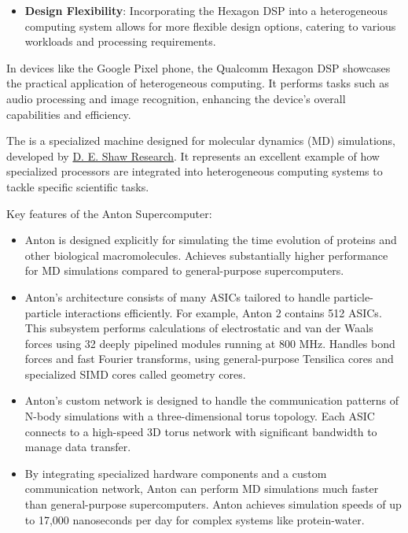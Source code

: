\begin{examplebox}
\begin{itemize}[label=\textcolor{Green3}{}]
        \item \textcolor{Green3}{\textbf{Design Flexibility}}: Incorporating the Hexagon DSP into a heterogeneous computing system allows for more flexible design options, catering to various workloads and processing requirements.
    \end{itemize}
    In devices like the Google Pixel phone, the Qualcomm Hexagon DSP showcases the practical application of heterogeneous computing. It performs tasks such as audio processing and image recognition, enhancing the device's overall capabilities and efficiency.
\end{examplebox}

\newpage

\begin{examplebox}
    The  is a specialized machine designed for molecular dynamics (MD) simulations, developed by \href{https://www.deshawresearch.com/}{D. E. Shaw Research}. It represents an excellent example of how specialized processors are integrated into heterogeneous computing systems to tackle specific scientific tasks.

    Key features of the Anton Supercomputer:
    \begin{itemize}
        \item Anton is designed explicitly for simulating the time evolution of proteins and other biological macromolecules. Achieves substantially higher performance for MD simulations compared to general-purpose supercomputers.

        \item Anton's architecture consists of many ASICs tailored to handle particle-particle interactions efficiently. For example, Anton 2 contains 512 ASICs. This subsystem performs calculations of electrostatic and van der Waals forces using 32 deeply pipelined modules running at 800 MHz. Handles bond forces and fast Fourier transforms, using general-purpose Tensilica cores and specialized SIMD cores called geometry cores.

        \item Anton's custom network is designed to handle the communication patterns of N-body simulations with a three-dimensional torus topology. Each ASIC connects to a high-speed 3D torus network with significant bandwidth to manage data transfer.

        \item By integrating specialized hardware components and a custom communication network, Anton can perform MD simulations much faster than general-purpose supercomputers. Anton achieves simulation speeds of up to 17,000 nanoseconds per day for complex systems like protein-water.
    \end{itemize}


\end{examplebox}

